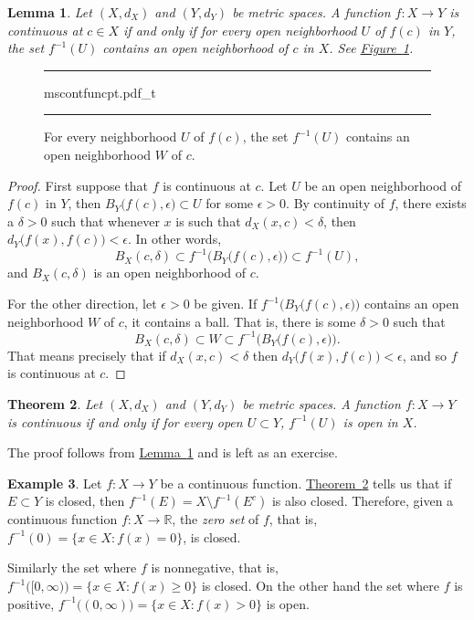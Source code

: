 \documentclass[12pt,openany]{book}
\newcommand{\R}{{\mathbb{R}}}
\newcommand{\myindex}[1]{#1\index{#1}}
\theoremstyle{plain}
\newtheorem{thm}{Theorem}[section]
\newtheorem{lemma}[thm]{Lemma}
\theoremstyle{remark}
\theoremstyle{definition}
\newenvironment{myfig}{%
\begin{figure}[h!t]
\noindent\rule{\textwidth}{0.4pt}\vspace{12pt}\par\centering}%
{\par\noindent\rule{\textwidth}{0.4pt}
\end{figure}}
\theoremstyle{exercise}
\theoremstyle{example}
\newtheorem{example}[thm]{Example}
\newcommand{\figureref}[1]{\hyperref[#1]{Figure~\ref*{#1}}}
\newcommand{\thmref}[1]{\hyperref[#1]{Theorem~\ref*{#1}}}
\newcommand{\lemmaref}[1]{\hyperref[#1]{Lemma~\ref*{#1}}}
\begin{document}
\begin{lemma} \label{lemma:mstopocontloc}
Let $(X,d_X)$ and $(Y,d_Y)$ be metric spaces.
A function $f \colon X \to Y$ is continuous at $c \in X$
if and only if for every open neighborhood $U$ of $f(c)$ in $Y$, the set
$f^{-1}(U)$ contains an open neighborhood of $c$ in $X$.
See \figureref{fig:mscontfuncpt}.
\end{lemma}

\begin{myfig}
{mscontfuncpt.pdf_t}
\caption{For every neighborhood $U$ of $f(c)$, the set $f^{-1}(U)$ contains an open
neighborhood $W$ of $c$.\label{fig:mscontfuncpt}}
\end{myfig}

\begin{proof}
First suppose that $f$ is continuous at $c$.
Let $U$ be an open neighborhood of $f(c)$
in $Y$, then $B_Y\bigl(f(c),\epsilon\bigr) \subset U$ for some $\epsilon >
0$.  By continuity of $f$, there exists a $\delta > 0$
such that whenever $x$ is such that $d_X(x,c) < \delta$, then
$d_Y\bigl(f(x),f(c)\bigr) < \epsilon$.  In other words,
\begin{equation*}
B_X(c,\delta) \subset f^{-1}\bigl(B_Y\bigl(f(c),\epsilon\bigr)\bigr) \subset
f^{-1}(U) ,
\end{equation*}
and $B_X(c,\delta)$ is an open neighborhood of $c$.

For the other direction,
let $\epsilon > 0$ be given.  If
$f^{-1}\bigl(B_Y\bigl(f(c),\epsilon\bigr)\bigr)$ contains an open
neighborhood $W$ of $c$, it contains a ball.  That is, there is some $\delta > 0$
such that
\begin{equation*}
B_X(c,\delta) \subset W \subset f^{-1}\bigl(B_Y\bigl(f(c),\epsilon\bigr)\bigr) .
\end{equation*}
That means precisely that if $d_X(x,c) < \delta$ then $d_Y\bigl(f(x),f(c)\bigr)
< \epsilon$, and so $f$ is continuous at $c$.
\end{proof}

\begin{thm} \label{thm:mstopocont}
Let $(X,d_X)$ and $(Y,d_Y)$ be metric spaces.  A function $f \colon X \to Y$
is continuous if and only if
for every open $U \subset Y$, $f^{-1}(U)$ is open in $X$.
\end{thm}

The proof follows from \lemmaref{lemma:mstopocontloc} and is left as
an exercise.

\begin{example}
Let $f \colon X \to Y$ be a continuous function.
\thmref{thm:mstopocont} tells us that if $E \subset Y$ is closed, then 
$f^{-1}(E) = X \setminus f^{-1}(E^c)$ is also closed.  Therefore,
given
a continuous
function $f \colon X \to \R$, the
\emph{\myindex{zero set}} of $f$, that is, 
$f^{-1}(0) = \{ x \in X :
f(x) = 0 \}$, is closed.

Similarly the set where $f$ is nonnegative, that is,
$f^{-1}\bigl( [0,\infty) \bigr) = \{ x \in X :
f(x) \geq 0 \}$ is closed.  On the other hand the
set where $f$ is positive,
$f^{-1}\bigl( (0,\infty) \bigr) = \{ x \in X :
f(x) > 0 \}$ is open.  
\end{example}
\end{document}
